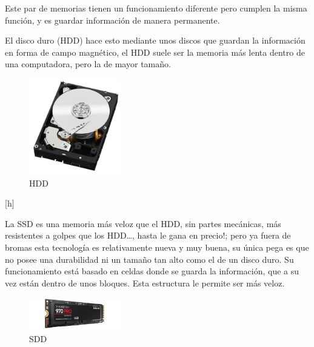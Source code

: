 \documentclass{article}
\begin{document}
Este par de memorias tienen un funcionamiento diferente pero cumplen la misma función, y es guardar información de manera permanente.
\vspace{0.4cm}


El disco duro (HDD) hace esto mediante unos discos que guardan la información en forma de campo magnético, el HDD suele ser la memoria más lenta dentro de una computadora, pero la de mayor tamaño.\cite{ssd}
\vspace{0.4cm}

\begin{figure}
    \centering
    \includegraphics[width=4cm]{HDD.png}
    \caption{HDD}
    \label{fig:my_label}
\end{figure}[h]


La SSD es una memoria más veloz que el HDD, sin partes mecánicas, más resistentes a golpes que los HDD…, hasta le gana en precio!; pero ya fuera de bromas esta tecnología es relativamente nueva y muy buena, su única pega es que no posee una durabilidad ni un tamaño tan alto como el de un disco duro. Su funcionamiento está basado en celdas donde se guarda la información, que a su vez están dentro de unos bloques. Esta estructura le permite ser más veloz.\cite{disco}

\begin{figure}
    \centering
    \includegraphics[width=4cm]{SSD.jpg}
    \caption{SDD}
    \label{fig:my_label}
\end{figure}
\end{document}
